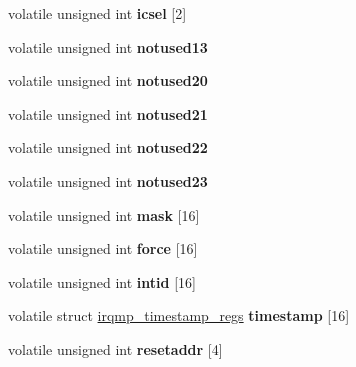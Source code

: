 \begin{DoxyCompactItemize}
volatile unsigned int {\bfseries icsel} \mbox{[}2\mbox{]}
\item 
\mbox{\label{structirqmp__regs_a11e3f0730cf7b82b7f9c36c739dba31c}} 
volatile unsigned int {\bfseries notused13}
\item 
\mbox{\label{structirqmp__regs_a6edc428b4e9a6850990b26c9c6eb3338}} 
volatile unsigned int {\bfseries notused20}
\item 
\mbox{\label{structirqmp__regs_a6a79f1ec0d4caeb9fd543d3816b9d585}} 
volatile unsigned int {\bfseries notused21}
\item 
\mbox{\label{structirqmp__regs_a2deea8c8e3d9efc72a8d2b14c1a6e115}} 
volatile unsigned int {\bfseries notused22}
\item 
\mbox{\label{structirqmp__regs_aad2dd2be86ce41aad0ed20c600ac7054}} 
volatile unsigned int {\bfseries notused23}
\item 
\mbox{\label{structirqmp__regs_a8f7421b4c226c4af9a14c51534c5a9d3}} 
volatile unsigned int {\bfseries mask} \mbox{[}16\mbox{]}
\item 
\mbox{\label{structirqmp__regs_a327bc5391615cb8b41ad42df6221d1e9}} 
volatile unsigned int {\bfseries force} \mbox{[}16\mbox{]}
\item 
\mbox{\label{structirqmp__regs_aea14f43c52283e40406b2b28bfb55731}} 
volatile unsigned int {\bfseries intid} \mbox{[}16\mbox{]}
\item 
\mbox{\label{structirqmp__regs_a3af5b81b85a121cf3900a9fd3fef28f9}} 
volatile struct \mbox{\hyperlink{structirqmp__timestamp__regs}{irqmp\+\_\+timestamp\+\_\+regs}} {\bfseries timestamp} \mbox{[}16\mbox{]}
\item 
\mbox{\label{structirqmp__regs_a1d56c169213ad1b850ad138dede554c3}} 
volatile unsigned int {\bfseries resetaddr} \mbox{[}4\mbox{]}
\item 
\mbox{\label{structirqmp__regs_a2f9b07765ae7da4417170ae83568c184}} 

\end{DoxyCompactItemize}
